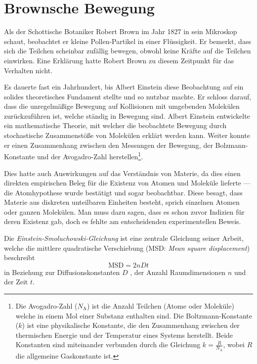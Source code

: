 %
%
%
%

\section{Brownsche Bewegung\label{brown:BrownBewegung}}

Als der Schottische Botaniker Robert Brown im Jahr 1827 in sein Mikroskop schaut, beobachtet er kleine Pollen-Partikel in einer Flüssigkeit. Er bemerkt, dass sich die Teilchen scheinbar zufällig bewegen, obwohl keine Kräfte auf die Teilchen einwirken. Eine Erklärung hatte Robert Brown zu diesem Zeitpunkt für das Verhalten nicht.


Es dauerte fast ein Jahrhundert, bis Albert Einstein diese Beobachtung auf ein solides theoretisches Fundament stellte und so nutzbar machte. Er schloss darauf, dass die unregelmäßige Bewegung auf Kollisionen mit umgebenden Molekülen zurückzuführen ist, welche ständig in Bewegung sind. Albert Einstein entwickelte ein mathematische Theorie, mit welcher die beobachtete Bewegung durch stochastische Zusammenstöße von Molekülen erklärt werden kann. Weiter konnte er einen Zusammenhang zwischen den Messungen der Bewegung, der Bolzmann-Konstante und der  Avogadro-Zahl herstellen\footnote{Die Avogadro-Zahl ($N_\mathrm{A}$) ist die Anzahl Teilchen (Atome oder Moleküle) welche in einem Mol einer Substanz enthalten sind. Die Boltzmann-Konstante ($k$) ist eine physikalische Konstante, die den Zusammenhang zwischen der thermischen Energie und der Temperatur eines Systems herstellt. Beide Konstanten sind miteinander verbunden durch die Gleichung $k = \frac{R}{N_\mathrm{A}}$, wobei $R$ die allgemeine Gaskonstante ist.}.


Dies hatte auch Auswirkungen auf das Verständnis von Materie, da dies einen direkten empirischen Beleg für die Existenz von Atomen und Moleküle lieferte --- die Atomhypothese wurde bestätigt und sogar beobachtbar. Diese besagt, dass Materie aus diskreten unteilbaren Einheiten besteht, sprich einzelnen Atomen oder ganzen Molekülen. Man muss dazu sagen, dass es schon zuvor Indizien für deren Existenz gab, doch es fehlte am entscheidenden experimentellen Beweis.


Die \textit{Einstein-Smoluchowski-Gleichung} ist eine zentrale Gleichung seiner Arbeit, welche die mittlere quadratische Verschiebung (MSD: \textit{Mean square displacement}) beschreibt
\begin{equation}
	\mathrm{MSD} = 2nDt
\end{equation}
in Beziehung zur Diffusionskonstanten $ D $ , der Anzahl Raumdimensionen $ n $ und der Zeit $ t $.

